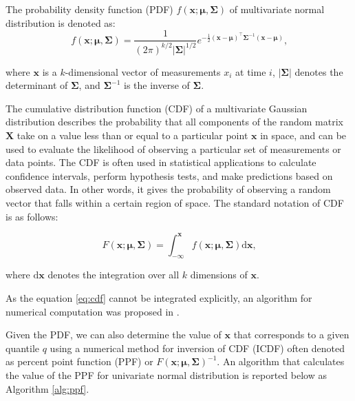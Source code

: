The probability density function (PDF) \(f(\boldsymbol{x}; \boldsymbol{\mu}, \boldsymbol{\Sigma})\) of multivariate normal distribution is denoted as:
\begin{equation}
f(\boldsymbol{x}; \boldsymbol{\mu}, \boldsymbol{\Sigma}) = \frac{1}{(2\pi)^{k/2} |\boldsymbol{\Sigma}|^{1/2}} e^{-\frac{1}{2} (\boldsymbol{x}-\boldsymbol{\mu})^\top \boldsymbol{\Sigma}^{-1} (\boldsymbol{x}-\boldsymbol{\mu})}\text{,}
\end{equation}

where $\boldsymbol{x}$ is a $k$-dimensional vector of measurements $x_i$ at time $i$, $|\boldsymbol{\Sigma}|$ denotes the determinant of $\boldsymbol{\Sigma}$, and $\boldsymbol{\Sigma}^{-1}$ is the inverse of $\boldsymbol{\Sigma}$.

The cumulative distribution function (CDF) of a multivariate Gaussian distribution describes the probability that all components of the random matrix \(\boldsymbol{X}\) take on a value less than or equal to a particular point \(\boldsymbol{x}\) in space, and can be used to evaluate the likelihood of observing a particular set of measurements or data points. The CDF is often used in statistical applications to calculate confidence intervals, perform hypothesis tests, and make predictions based on observed data. In other words, it gives the probability of observing a random vector that falls within a certain region of space. The standard notation of CDF is as follows:

\begin{equation}
F(\boldsymbol{x}; \boldsymbol{\mu}, \boldsymbol{\Sigma}) = \int_{-\infty}^{\boldsymbol{x}} f(\boldsymbol{x}; \boldsymbol{\mu}, \boldsymbol{\Sigma}) \text{d}\boldsymbol{x}\text{,}\label{eq:cdf}
\end{equation}

where $\text{d}\boldsymbol{x}$ denotes the integration over all $k$ dimensions of $\boldsymbol{x}$.

As the equation \eqref{eq:cdf} cannot be integrated explicitly, an algorithm for numerical computation was proposed in \cite{Genz2000}.


Given the PDF, we can also determine the value of \(\boldsymbol{x}\) that corresponds to a given quantile $q$ using a numerical method for inversion of CDF (ICDF) often denoted as percent point function (PPF) or $F(\boldsymbol{x}; \boldsymbol{\mu}, \boldsymbol{\Sigma})^{-1}$. An algorithm that calculates the value of the PPF for univariate normal distribution is reported below as Algorithm \ref{alg:ppf}.


